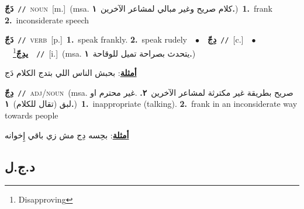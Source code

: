 \documentclass[10pt,a4paper,twoside]{article} %
\begin{document}
\begin{multicols}{2}
{\setlength\topsep{0pt}\textbf{\foreignlanguage{arabic}{دَجّ}}\ {\color{gray}\texttt{//}\color{black}}\ \textsc{noun}\ [m.]\ \color{gray}(msa. \foreignlanguage{arabic}{كلام صريح وغير مبالي لمشاعر الآخرين}~\foreignlanguage{arabic}{\textbf{١.}})\color{black}\ \textbf{1.}~frank  \textbf{2.}~inconsiderate speech\ } \vspace{2mm}

{\setlength\topsep{0pt}\textbf{\foreignlanguage{arabic}{دَجّ}}\ {\color{gray}\texttt{//}\color{black}}\ \textsc{verb}\ [p.]\ \textbf{1.}~speak frankly.  \textbf{2.}~speak rudely\ \ $\bullet$\ \ \setlength\topsep{0pt}\textbf{\foreignlanguage{arabic}{دِجّ}}\ {\color{gray}\texttt{//}\color{black}}\ [c.]\ \ $\bullet$\ \ \setlength\topsep{0pt}\textbf{\foreignlanguage{arabic}{يدِجّ}}\footnote{Disapproving}\ \ {\color{gray}\texttt{//}\color{black}}\ [i.]\ \color{gray}(msa. \foreignlanguage{arabic}{يتحدث بصراحة تميل للوقاحة}~\foreignlanguage{arabic}{\textbf{١.}})\color{black}\  \begin{flushright}\color{gray}\foreignlanguage{arabic}{\textbf{\underline{\foreignlanguage{arabic}{أمثلة}}}: بحبش الناس اللي بتدج الكلام دَج}\end{flushright}\color{black}} \vspace{2mm}

{\setlength\topsep{0pt}\textbf{\foreignlanguage{arabic}{دِجّ}}\ {\color{gray}\texttt{//}\color{black}}\ \textsc{adj/noun}\ \color{gray}(msa. \foreignlanguage{arabic}{صريح بطريقة غير مكترثة لمشاعر الآخرين}~\foreignlanguage{arabic}{\textbf{٢.}}  .\foreignlanguage{arabic}{غير محترم او لبق (تقال للكلام)}~\foreignlanguage{arabic}{\textbf{١.}})\color{black}\ \textbf{1.}~inappropriate (talking).  \textbf{2.}~frank in an inconsiderate way towards people\  \begin{flushright}\color{gray}\foreignlanguage{arabic}{\textbf{\underline{\foreignlanguage{arabic}{أمثلة}}}: بحِسه دِج مش زي باقي إِخوانه}\end{flushright}\color{black}} \vspace{2mm}

\vspace{-3mm}
\subsection*{\color{blue}\foreignlanguage{arabic}{د.ج.ل}\color{blue}{}} 


\end{multicols}
\end{document}
